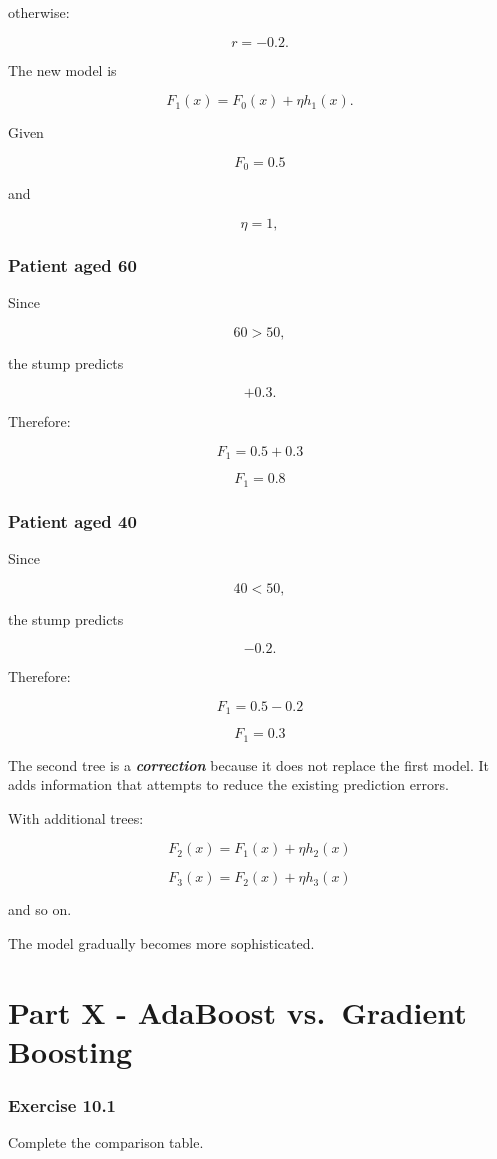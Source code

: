 \documentclass[10pt]{article}
\begin{document}
otherwise:

\[
r=-0.2.
\]

The new model is

\[
F_1(x)=F_0(x)+\eta h_1(x).
\]

Given

\[
F_0=0.5
\]

and

\[
\eta=1,
\]

\subsubsection*{Patient aged 60}
Since

\[
60>50,
\]

the stump predicts

\[
+0.3.
\]

Therefore:

\[
F_1=0.5+0.3
\]

\[
{F_1=0.8}
\]

\subsubsection*{Patient aged 40}
Since

\[
40<50,
\]

the stump predicts

\[
-0.2.
\]

Therefore:

\[
F_1=0.5-0.2
\]

\[
{F_1=0.3}
\]

The second tree is a \textbf{\textit{correction}} because it does not replace the first model. It adds information that attempts to reduce the existing prediction errors.

With additional trees:

\[
F_2(x)=F_1(x)+\eta h_2(x)
\]

\[
F_3(x)=F_2(x)+\eta h_3(x)
\]

and so on.

The model gradually becomes more sophisticated.

\par\endgroup

\clearpage
\section*{Part X - AdaBoost vs. Gradient Boosting}
\subsubsection*{Exercise 10.1}
Complete the comparison table.
\end{document}
